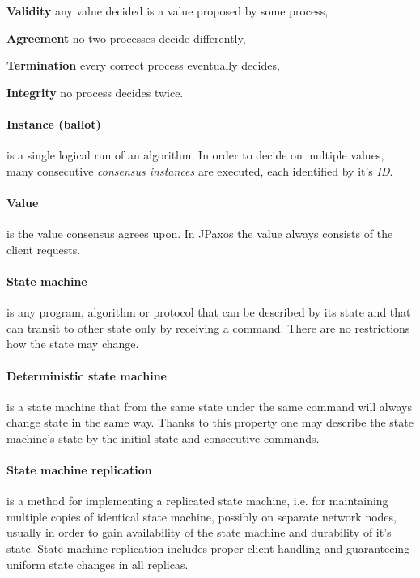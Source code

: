 \begin{tightList}[\setlength{\leftmargin}{2\leftmargin}]
    \item[\textbf{Validity}] any value decided is a value proposed by some process,
    \item[\textbf{Agreement}] no two processes decide differently,
    \item[\textbf{Termination}] every correct process eventually decides,
    \item[\textbf{Integrity}] no process decides twice.
\end{tightList}

\paragraph{Instance (ballot)} is a single logical run of an algorithm. In order to decide on multiple values, many consecutive \textit{consensus instances} are executed, each identified by it's \textit{ID}.

\paragraph{Value} is the value consensus agrees upon. In JPaxos the value always consists of the client requests.

\paragraph{State machine}
is any program, algorithm or protocol that can be described by its state and that can transit to other state only by receiving a command.
There are no restrictions how the state may change.

\paragraph{Deterministic state machine}
is a state machine that from the same state under the same command will always change state in the same way.
Thanks to this property one may describe the state machine's state by the initial state and consecutive commands. 

\paragraph{State machine replication} is a method for implementing a replicated state machine, i.e. for maintaining multiple copies of identical state machine, possibly on separate network nodes, usually in order to gain availability of the state machine and durability of it's state. State machine replication includes proper client handling and guaranteeing uniform state changes in all replicas.

